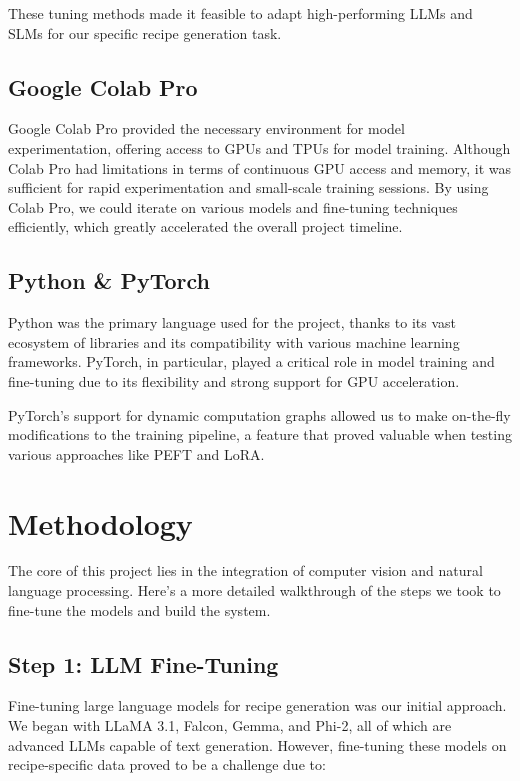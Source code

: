 \documentclass[letterpaper,11pt]{report}
\begin{document}
These tuning methods made it feasible to adapt high-performing LLMs and SLMs for our specific recipe generation task.

\subsection{Google Colab Pro}

Google Colab Pro provided the necessary environment for model experimentation, offering access to GPUs and TPUs for model training. Although Colab Pro had limitations in terms of continuous GPU access and memory, it was sufficient for rapid experimentation and small-scale training sessions. By using Colab Pro, we could iterate on various models and fine-tuning techniques efficiently, which greatly accelerated the overall project timeline.

\subsection{Python & PyTorch}

Python was the primary language used for the project, thanks to its vast ecosystem of libraries and its compatibility with various machine learning frameworks. PyTorch, in particular, played a critical role in model training and fine-tuning due to its flexibility and strong support for GPU acceleration.

PyTorch’s support for dynamic computation graphs allowed us to make on-the-fly modifications to the training pipeline, a feature that proved valuable when testing various approaches like PEFT and LoRA.

\section{Methodology}

The core of this project lies in the integration of computer vision and natural language processing. Here’s a more detailed walkthrough of the steps we took to fine-tune the models and build the system.

\subsection{Step 1: LLM Fine-Tuning}

Fine-tuning large language models for recipe generation was our initial approach. We began with LLaMA 3.1, Falcon, Gemma, and Phi-2, all of which are advanced LLMs capable of text generation. However, fine-tuning these models on recipe-specific data proved to be a challenge due to:
\end{document}
